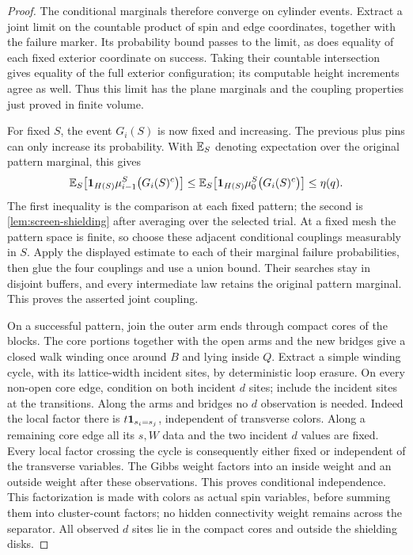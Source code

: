 \begin{proof}
The conditional marginals therefore converge on cylinder events. Extract
a joint limit on the countable product of spin and edge coordinates,
together with the failure marker. Its probability bound passes to the limit,
as does equality of each fixed exterior coordinate on success. Taking their
countable intersection gives equality of the full exterior configuration;
its computable height increments agree as well. Thus this limit has the
plane marginals and the coupling properties just proved in finite volume.

For fixed $S$, the event $G_i(S)$ is now fixed and increasing. The previous
plus pins can only increase its probability. With $\mathbb E_S$ denoting
expectation over the original pattern marginal, this gives
\[
 \mathbb E_S\!\left[\mathbf 1_{H(S)}
       \mu_{i-1}^S\bigl(G_i(S)^c\bigr)\right]
 \le
 \mathbb E_S\!\left[\mathbf 1_{H(S)}
       \mu_0^S\bigl(G_i(S)^c\bigr)\right]
 \le \eta(q).
\]
The first inequality is the comparison at each fixed pattern; the second
is \cref{lem:screen-shielding} after averaging over the selected trial.
At a fixed mesh the pattern space is finite, so choose these adjacent
conditional couplings measurably in $S$. Apply the displayed estimate to
each of their marginal failure probabilities, then glue the four couplings
and use a union bound. Their searches stay in disjoint buffers, and every
intermediate law retains the original pattern marginal. This proves the
asserted joint coupling.

On a successful pattern, join the outer arm ends through compact cores
of the blocks. The core portions together with the open arms and the
new bridges give a closed walk winding once around $B$ and lying inside
$Q$. Extract a simple winding cycle, with its lattice-width incident
sites, by deterministic loop erasure. On every non-open core edge,
condition on both incident $d$ sites; include the incident sites at the
transitions. Along the arms and bridges no $d$ observation is needed.
Indeed the local factor there is $t\mathbf 1_{s_i=s_j}$, independent of
transverse colors. Along a remaining core edge all its $s,W$ data and
the two incident $d$ values are fixed. Every local factor crossing the
cycle is consequently either fixed or independent of the transverse
variables. The Gibbs weight factors into an inside weight and an
outside weight after these observations. This proves conditional
independence. This factorization is made with colors as actual spin
variables, before summing them into cluster-count factors; no hidden
connectivity weight remains across the separator. All observed $d$
sites lie in the compact cores and outside the shielding disks.
\end{proof}

